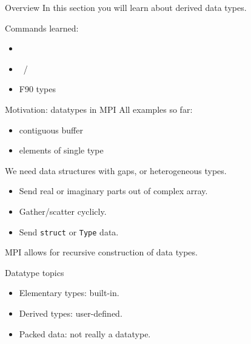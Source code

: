 
\begin{numberedframe}{Overview}
  In this section you will learn about derived data types.

  Commands learned:
  \begin{itemize}
  \item {}
  \item {}~/ 
  \item F90 types
  \end{itemize}
\end{numberedframe}


\begin{numberedframe}{Motivation: datatypes in MPI}
  All examples so far: 
  \begin{itemize}
  \item contiguous buffer
  \item elements of single type
  \end{itemize}
  We need data structures with gaps, or heterogeneous types.
  \begin{itemize}
  \item Send real or imaginary parts out of complex array.
  \item Gather/scatter cyclicly.
  \item Send \lstinline{struct} or \lstinline{Type} data.
  \end{itemize}
  MPI allows for recursive construction of data types.
\end{numberedframe}

\begin{numberedframe}{Datatype topics}
  \begin{itemize}
  \item Elementary types: built-in.
  \item Derived types: user-defined.
  \item Packed data: not really a datatype.
  \end{itemize}
\end{numberedframe}

